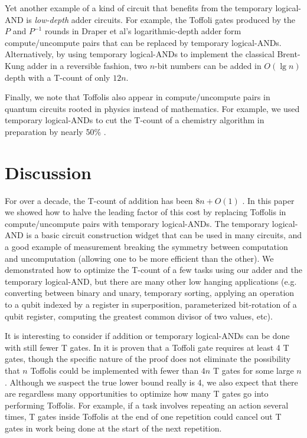 \documentclass[twocolumn]{quantumarticle-customized}
\begin{document}
Yet another example of a kind of circuit that benefits from the temporary logical-AND is {\em low-depth} adder circuits.
For example, the Toffoli gates produced by the $P$ and $P^{-1}$ rounds in Draper et al's logarithmic-depth adder \cite{Draper2004} form compute/uncompute pairs that can be replaced by temporary logical-ANDs.
Alternatively, by using temporary logical-ANDs to implement the classical Brent-Kung adder \cite{brent1982} in a reversible fashion, two $n$-bit numbers can be added in $O(\lg n)$ depth with a T-count of only $12n$.

Finally, we note that Toffolis also appear in compute/uncompute pairs in quantum circuits rooted in physics instead of mathematics.
For example, we used temporary logical-ANDs to cut the T-count of a chemistry algorithm in preparation by nearly 50\% \cite{Babbush2018}.


\section*{Discussion}

For over a decade, the T-count of addition has been $8n + O(1)$ \cite{Amy2013, Barenco1995, Cuccaro2004}.
In this paper we showed how to halve the leading factor of this cost by replacing Toffolis in compute/uncompute pairs with temporary logical-ANDs.
The temporary logical-AND is a basic circuit construction widget that can be used in many circuits, and a good example of measurement breaking the symmetry between computation and uncomputation (allowing one to be more efficient than the other).
We demonstrated how to optimize the T-count of a few tasks using our adder and the temporary logical-AND, but there are many other low hanging applications (e.g. converting between binary and unary, temporary sorting, applying an operation to a qubit indexed by a register in superposition, parameterized bit-rotation of a qubit register, computing the greatest common divisor of two values, etc).

It is interesting to consider if addition or temporary logical-ANDs can be done with still fewer T gates.
In \cite{Howard2017} it is proven that a Toffoli gate requires at least 4 T gates, though the specific nature of the proof does not eliminate the possibility that $n$ Toffolis could be implemented with fewer than $4n$ T gates for some large $n$.
Although we suspect the true lower bound really is 4, we also expect that there are regardless many opportunities to optimize how many T gates go into performing Toffolis.
For example, if a task involves repeating an action several times, T gates inside Toffolis at the end of one repetition could cancel out T gates in work being done at the start of the next repetition.
\end{document}
